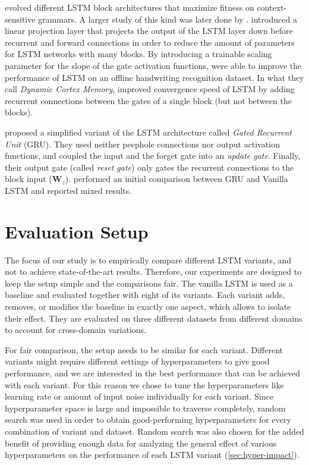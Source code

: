 \citet{Bayer2009} evolved different LSTM block architectures that maximize fitness on context-sensitive grammars. A larger study of this kind was later done by \citet{Jozefowicz2015}.
\citet{Sak2014} introduced a linear projection layer that projects the output of the LSTM layer down before recurrent and forward connections in order to reduce the amount of parameters for LSTM networks with many blocks. By introducing a trainable scaling parameter for the slope of the gate activation functions, \citet{Doetsch2014} were able to improve the performance of LSTM on an offline handwriting recognition dataset. In what they call \emph{Dynamic Cortex Memory}, \citet{Otte2014} improved convergence speed of LSTM by adding recurrent connections between the gates of a single block (but not between the blocks). 

\citet{Cho2014} proposed a simplified variant of the LSTM architecture called \emph{Gated Recurrent Unit} (GRU). They used neither peephole connections nor output activation functions, and coupled the input and the forget gate into an \emph{update gate}. Finally, their output gate (called \emph{reset gate}) only gates the recurrent connections to the block input ($\mathbf{W}_z$). \citet{Chung2014} performed an initial comparison between GRU and Vanilla LSTM and reported mixed results.

\section{Evaluation Setup} The focus of our study is to empirically compare different LSTM variants, and not to achieve state-of-the-art results. Therefore, our experiments are designed to keep the setup simple and the comparisons fair. The vanilla LSTM is used as a baseline and evaluated together with eight of its variants. Each variant adds, removes, or modifies the baseline in exactly one aspect, which allows to isolate their effect. They are evaluated on three different datasets from different domains to account for cross-domain variations.

For fair comparison, the setup needs to be similar for each variant. Different variants might require different settings of hyperparameters to give good performance, and we are interested in the best performance that can be achieved with each variant. For this reason we chose to tune the hyperparameters like learning rate or amount of input noise individually for each variant. Since hyperparameter space is large and impossible to traverse completely, random search was used in order to obtain good-performing hyperparameters \cite{Bergstra2012} for every combination of variant and dataset. Random search was also chosen for the added benefit of providing enough data for analyzing the general effect of various hyperparameters on the performance of each LSTM variant (\autoref{sec:hyper-impact}).

